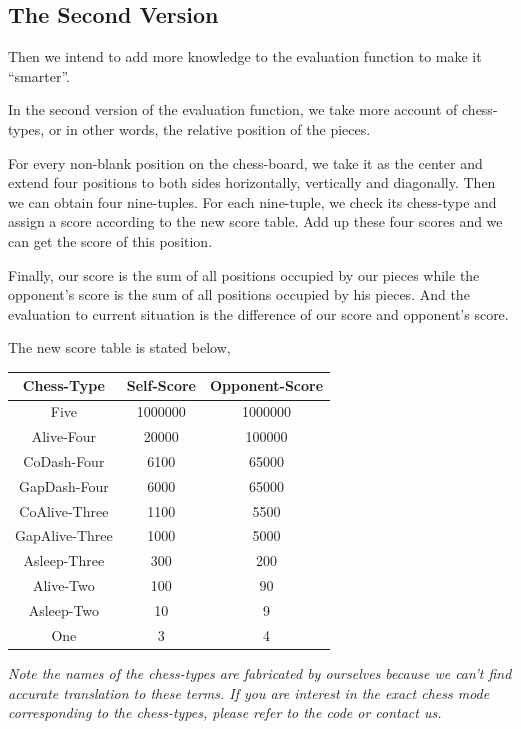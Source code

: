 \documentclass[11pt,a4paper]{article}
\begin{document}
\subsection{The Second Version}
Then we intend to add more knowledge to the evaluation function to make it ``smarter''.

In the second version of the evaluation function, we take more account of chess-types, or in other words, the relative position of the pieces.

For every non-blank position on the chess-board, we take it as the center and extend four positions to both sides horizontally, vertically and diagonally. Then we can obtain four nine-tuples. For each nine-tuple, we check its chess-type and assign a score according to the new score table. Add up these four scores and we can get the score of this position.

Finally, our score is the sum of all positions occupied by our pieces while the opponent's score is the sum of all positions occupied by his pieces. And the evaluation to current situation is the difference of our score and opponent's score.

The new score table is stated below,
\begin{table}[h]
\centering
\begin{tabular}{c|c|c}
\hline
Chess-Type&Self-Score&Opponent-Score  \\
\hline
Five&1000000&1000000\\
Alive-Four&20000&100000\\
CoDash-Four&6100&65000\\
GapDash-Four&6000&65000\\
CoAlive-Three&1100&5500\\
GapAlive-Three&1000&5000\\
Asleep-Three&300&200\\
Alive-Two&100&90\\
Asleep-Two&10&9\\
One&3&4\\
\hline
\end{tabular}
\end{table}

\noindent\begin{small}\emph{Note the names of the chess-types are fabricated by ourselves because we can't find accurate translation to these terms. If you are interest in the exact chess mode corresponding to the chess-types, please refer to the code or contact us.}\end{small}
\end{document}
